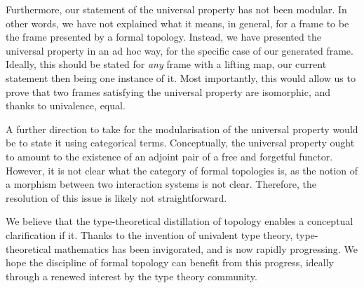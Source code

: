 Furthermore, our statement of the universal property has not been modular. In other words,
we have not explained what it means, in general, for a frame to be the frame presented by
a formal topology. Instead, we have presented the universal property in an ad hoc way, for
the specific case of our generated frame. Ideally, this should be stated for \emph{any}
frame with a lifting map, our current statement then being one instance of it. Most
importantly, this would allow us to prove that two frames satisfying the universal
property are isomorphic, and thanks to univalence, equal.

A further direction to take for the modularisation of the universal property would be to
state it using categorical terms. Conceptually, the universal property ought to amount to
the existence of an adjoint pair of a free and forgetful functor. However, it is not clear
what the category of formal topologies is, as the notion of a morphism between two
interaction systems is not clear. Therefore, the resolution of this issue is likely not
straightforward.

We believe that the type-theoretical distillation of topology enables a conceptual
clarification if it. Thanks to the invention of univalent type theory, type-theoretical
mathematics has been invigorated, and is now rapidly progressing. We hope the discipline
of formal topology can benefit from this progress, ideally through a renewed interest by
the type theory community.
